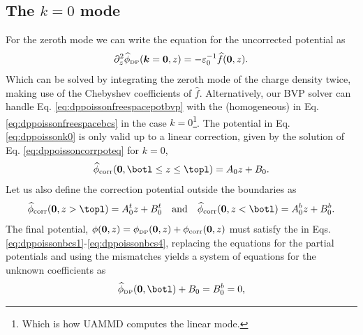 \documentclass[ twoside,openright,titlepage,numbers=noenddot,%
headinclude,footinclude,cleardoublepage=empty,abstract=on,
BCOR=5mm,paper=b5,fontsize=11pt, dvipsnames
]{scrreprt}
\renewcommand{\vec}[1]{\bm{#1}}
\newcommand{\uammd}{\gls{UAMMD}\xspace}
\newcommand{\fou}[1]{\widehat{#1}}
\newcommand{\corr}{\text{corr}}
\newcommand{\dpr}{\text{\tiny DP}}
\begin{document}
\subsection{The $k=0$ mode}\label{sec:dpelectroneutral}
For the zeroth mode we can write the equation for the uncorrected potential as
\begin{equation}
  \label{eq:dppoissonk0}
  \partial_z ^2\fou{\phi}_{\dpr}(\vec{k}=\vec{0}, z) = -  \varepsilon_0^{-1}\fou{f}(\vec{0}, z).
\end{equation}
Which can be solved by integrating the zeroth mode of the charge density twice, making use of the Chebyshev coefficients of $\fou{f}$. Alternatively, our \gls{BVP} solver can handle Eq. \eqref{eq:dppoissonfreespacepotbvp} with the (homogeneous) \bcs in Eq. \eqref{eq:dppoissonfreespacebcs} in the case $k=0$\footnote{Which is how \uammd computes the linear mode.}.
The potential in Eq. \eqref{eq:dppoissonk0} is only valid up to a linear correction, given by the solution of Eq. \eqref{eq:dppoissoncorrpoteq} for $k=0$,
\begin{equation}
  \fou{\phi}_{\corr}(\vec{0}, \botl\le z\le \topl) = A_0z + B_0.
\end{equation}
Let us also define the correction potential outside the boundaries as
\begin{equation}
  \fou{\phi}_{\corr}(\vec{0}, z> \topl) = A^t_0z + B^t_0 \quad\text{and}\quad \fou{\phi}_{\corr}(\vec{0}, z<\botl) = A^b_0z + B^b_0.
\end{equation}
The final potential, $\phi(\vec{0},z) = \phi_{\dpr}(\vec{0},z) + \phi_{\corr}(\vec{0},z)$ must satisfy the \bcs in Eqs. \eqref{eq:dppoissonbcs1}-\eqref{eq:dppoissonbcs4}, replacing the equations for the partial potentials and using the mismatches yields a system of equations for the unknown coefficients as
\begin{equation}
  \label{eq:dppoissonB0}
  \fou{\phi}_{\dpr}(\vec{0}, \botl) + B_0 = B_0^b = 0,
\end{equation}
\end{document}
